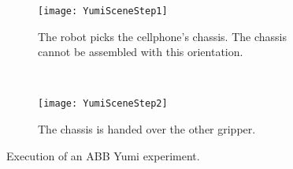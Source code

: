


\begin{figure}[h!]
        \centering
        \begin{subfigure}[b]{1\columnwidth}
                \centering
                \texttt{[image: YumiSceneStep1]}
                \caption{The robot picks the cellphone's chassis. The chassis cannot be assembled with this orientation. }
                \label{planning:SI.fig.Yumistep1}              
        \end{subfigure}       
        ~         
        \begin{subfigure}[b]{1\columnwidth}
                \centering
                \texttt{[image: YumiSceneStep2]}
                \caption{The chassis is handed over the other gripper. }
 			\label{planning:SI.fig.Yumistep2}  
         \end{subfigure}
        \caption{Execution of an ABB Yumi experiment.}
        \label{planning:SI.fig.yumiscreen}
\end{figure}
\clearpage
